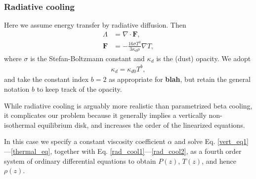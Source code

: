 \subsubsection{Radiative cooling}\label{rad_cool}
Here we assume energy transfer by radiative diffusion. Then
\begin{align}
  \Lambda &= \nabla\cdot\bm{F},\label{rad_cool1}\\
  \bm{F}   &= -\frac{16\sigma T^3}{3\kappa_d\rho}\nabla T, \label{rad_cool2}
\end{align}
where $\sigma$ is the Stefan-Boltzmann constant and 
$\kappa_d$ is the (dust) opacity. We adopt
\begin{align}\label{opacity_law}
  \kappa_d = \kappa_{d0}T^b,
\end{align}
and take the constant index $b=2$ as appropriate for {\bf blah},
but retain the general notation $b$ to keep track of the opacity.   

While radiative cooling is arguably more realistic than 
parametrized beta cooling, it complicates our 
problem because it generally implies a vertically non-isothermal
equilibrium disk, and increases the order of the linearized equations. 

In this case we specify a constant viscosity coefficient $\alpha$ and
solve Eq. \ref{vert_eq1}---\ref{thermal_eq}, together with
Eq. \ref{rad_cool1}---\ref{rad_cool2}, as a fourth order system of
ordinary differential equations to obtain $P(z)$, $T(z)$, and hence
$\rho(z)$. 


